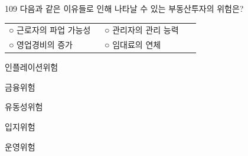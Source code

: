 \begin{question}{109}
다음과 같은 이유들로 인해 나타날 수 있는 부동산투자의 위험은?
\begin{framedtext}
\begin{tabular}{@{}p{0.47\linewidth}@{}p{0.47\linewidth}@{}}
○ 근로자의 파업 가능성 & ○ 관리자의 관리 능력 \\
○ 영업경비의 증가 & ○ 임대료의 연체 \\
\end{tabular}
\end{framedtext}
\begin{choices}
  \item 인플레이션위험
  \item 금융위험
  \item 유동성위험
  \item 입지위험
  \item 운영위험
\end{choices}
\end{question}
